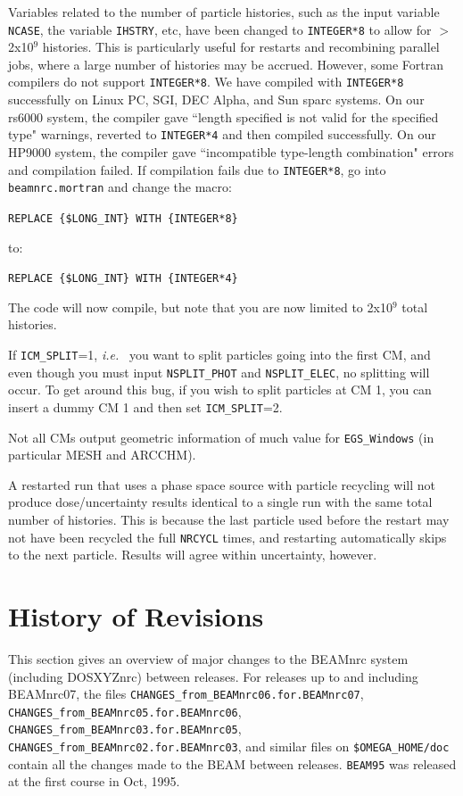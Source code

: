 \documentclass[12pt,twoside]{article}
\newcommand{\ie}{{\em i.e.}}
\begin{document}
Variables related to the number of particle histories, such as
the input variable {\tt NCASE}, the variable {\tt IHSTRY}, etc, have been
changed to {\tt INTEGER*8} to allow for $>$ 2x10$^9$ histories.  This is
particularly useful for restarts and recombining parallel jobs, where a large
number of histories may be accrued.  However,
some Fortran compilers do not support {\tt INTEGER*8}.  We have compiled
with {\tt INTEGER*8} successfully on Linux PC, SGI, DEC Alpha, and Sun sparc
systems.  On our rs6000 system, the compiler gave ``length specified is not
valid for the specified type" warnings, reverted to {\tt INTEGER*4} and then
compiled successfully.  On our HP9000 system, the compiler gave
``incompatible type-length combination" errors and compilation failed.  If
compilation fails due to {\tt INTEGER*8}, go into {\tt beamnrc.mortran} and
change the macro:

{\tt REPLACE \{\$LONG\_INT\} WITH \{INTEGER*8\}}

to:

{\tt REPLACE \{\$LONG\_INT\} WITH \{INTEGER*4\}}

The code will now compile, but note that you are now limited to
2x10$^9$ total histories.
\vspace{5mm}

If {\tt ICM\_SPLIT}=1, \ie~ you want to split particles going into the first
CM,
and even though you must input
{\tt NSPLIT\_PHOT} and {\tt NSPLIT\_ELEC}, no splitting will occur.
To get around this bug, if you wish to split particles at CM 1,
you can insert a dummy CM 1 and then
set {\tt ICM\_SPLIT}=2.

Not all CMs output geometric information of much value for {\tt EGS\_Windows}
(in particular MESH and ARCCHM).


A restarted run that uses a phase space source with particle recycling will
not produce dose/uncertainty results identical to a single run with
the same total number of histories.  This is because the last particle
used before the restart may not have been recycled the full
{\tt NRCYCL} times, and restarting automatically skips to the next particle.
Results will agree within uncertainty, however.

\section{History of Revisions}
This section gives an overview of major changes to the BEAMnrc system
(including DOSXYZnrc) between releases.  For releases up to and
including BEAMnrc07, the files
\verb+CHANGES_from_BEAMnrc06.for.BEAMnrc07+,
\verb+CHANGES_from_BEAMnrc05.for.BEAMnrc06+,
\verb+CHANGES_from_BEAMnrc03.for.BEAMnrc05+,
\verb+CHANGES_from_BEAMnrc02.for.BEAMnrc03+,
and similar files on
\verb+$OMEGA_HOME/doc+
contain all the changes made to the BEAM between releases.
\verb+BEAM95+ was released at the first
course in Oct, 1995.
\end{document}
